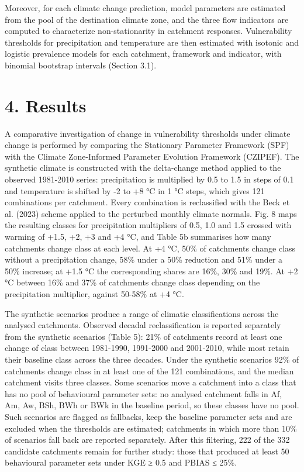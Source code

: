 \documentclass[
]{article}
\begin{document}
Moreover, for each climate change prediction, model parameters are
estimated from the pool of the destination climate zone, and the three
flow indicators are computed to characterize non-stationarity in
catchment responses. Vulnerability thresholds for precipitation and
temperature are then estimated with isotonic and logistic prevalence
models for each catchment, framework and indicator, with binomial
bootstrap intervals (Section 3.1).

\section{4. Results}\label{results}

A comparative investigation of change in vulnerability thresholds under
climate change is performed by comparing the Stationary Parameter
Framework (SPF) with the Climate Zone-Informed Parameter Evolution
Framework (CZIPEF). The synthetic climate is constructed with the
delta-change method applied to the observed 1981-2010 series:
precipitation is multiplied by 0.5 to 1.5 in steps of 0.1 and
temperature is shifted by -2 to +8 °C in 1 °C steps, which gives 121
combinations per catchment. Every combination is reclassified with the
Beck et al. (2023) scheme applied to the perturbed monthly climate
normals. Fig. 8 maps the resulting classes for precipitation multipliers
of 0.5, 1.0 and 1.5 crossed with warming of +1.5, +2, +3 and +4 °C, and
Table 5b summarises how many catchments change class at each level. At
+4 °C, 50\% of catchments change class without a precipitation change,
58\% under a 50\% reduction and 51\% under a 50\% increase; at +1.5 °C
the corresponding shares are 16\%, 30\% and 19\%. At +2 °C between 16\%
and 37\% of catchments change class depending on the precipitation
multiplier, against 50-58\% at +4 °C.

The synthetic scenarios produce a range of climatic classifications
across the analysed catchments. Observed decadal reclassification is
reported separately from the synthetic scenarios (Table 5): 21\% of
catchments record at least one change of class between 1981-1990,
1991-2000 and 2001-2010, while most retain their baseline class across
the three decades. Under the synthetic scenarios 92\% of catchments
change class in at least one of the 121 combinations, and the median
catchment visits three classes. Some scenarios move a catchment into a
class that has no pool of behavioural parameter sets: no analysed
catchment falls in Af, Am, Aw, BSh, BWh or BWk in the baseline period,
so these classes have no pool. Such scenarios are flagged as fallbacks,
keep the baseline parameter sets and are excluded when the thresholds
are estimated; catchments in which more than 10\% of scenarios fall back
are reported separately. After this filtering, 222 of the 332 candidate
catchments remain for further study: those that produced at least 50
behavioural parameter sets under KGE ≥ 0.5 and \textbar PBIAS\textbar{}
≤ 25\%.
\end{document}
